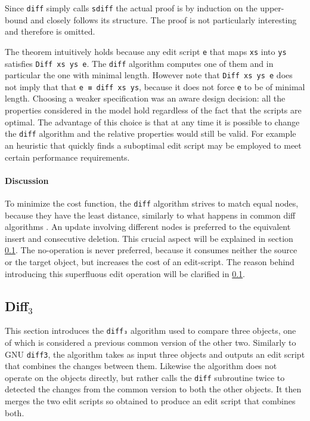 \documentclass[../Thesis.tex]{subfiles}
\begin{document}
	Since \texttt{diff} simply calls \texttt{sdiff} 	 the actual proof is 
	by induction on the upper-bound and closely follows its
	structure. The proof is not particularly interesting and therefore is omitted.

	The theorem intuitively holds because any edit script \texttt{e} that maps 
	\texttt{xs} into \texttt{ys} satisfies \texttt{Diff xs ys e}.
	The \texttt{diff} algorithm computes one of them and in particular the one
	with minimal length. 
	However note that \texttt{Diff xs ys e} does not imply that
	that \texttt{e ≡ diff xs ys}, because it does not force \texttt{e} to be 
	of minimal length.
	Choosing a weaker specification was an aware design decision:
	all the properties considered in the model hold regardless of 
	the fact that the scripts are optimal. The advantage
	of this choice is that at any time it is possible to change the \texttt{diff}
	algorithm and the relative properties would still be valid.
	For example an heuristic that quickly finds a suboptimal edit script 
	may be employed to meet certain performance requirements.
	
	\paragraph{Discussion}
	To minimize the cost function, the \texttt{diff} algorithm strives to 
	match equal nodes, because they have the least distance, similarly to 
	what happens in common diff algorithms \cite{Lemp09}.
	An update involving different nodes is preferred to the equivalent 
	insert and consecutive deletion. This crucial aspect will be explained
	in section \ref{subsec:diff3}.
	The no-operation is never preferred, because it consumes neither the
	source or the target object, but increases the cost of an edit-script.
	The reason behind introducing this superfluous edit operation	will be 
	clarified in \ref{subsec:diff3}.

	\subsection{Diff$_3$}
	\label{subsec:diff3}	
	This section introduces the \texttt{diff₃} algorithm used to compare 
	three objects, one of which is considered a previous common version
	of the other two.
	Similarly to GNU \texttt{diff3}, the algorithm takes as input three objects
	and outputs an edit script that combines the changes between them.
	Likewise the algorithm does not operate on the objects directly,
	but rather calls the \texttt{diff} subroutine twice to detected the changes 
	from the common version to both the other objects.
	It then merges the two edit scripts so obtained to produce an edit script
	that combines both.
	
\end{document}
